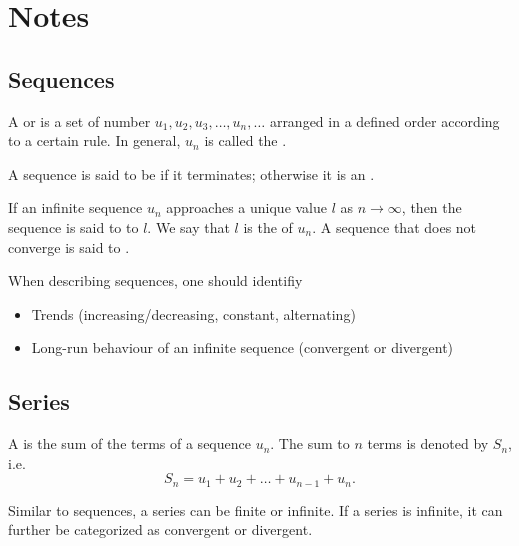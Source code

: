 \section{Notes}

\subsection{Sequences}

\begin{definition}
    A  or  is a set of number $u_1, u_2, u_3, \dots, u_n, \dots$ arranged in a defined order according to a certain rule. In general, $u_n$ is called the .
\end{definition}

\begin{definition}
    A sequence is said to be  if it terminates; otherwise it is an .
\end{definition}

\begin{definition}
    If an infinite sequence $u_n$ approaches a unique value $l$ as $n \to \infty$, then the sequence is said to  to $l$. We say that $l$ is the  of $u_n$. A sequence that does not converge is said to .
\end{definition}

When describing sequences, one should identifiy
\begin{itemize}
    \item Trends (increasing/decreasing, constant, alternating)
    \item Long-run behaviour of an infinite sequence (convergent or divergent)
\end{itemize}

\subsection{Series}

\begin{definition}
    A  is the sum of the terms of a sequence $u_n$. The sum to $n$ terms is denoted by $S_n$, i.e. \[S_n = u_1 + u_2 + \dots + u_{n-1} + u_n.\]
\end{definition}

Similar to sequences, a series can be finite or infinite. If a series is infinite, it can further be categorized as convergent or divergent.

